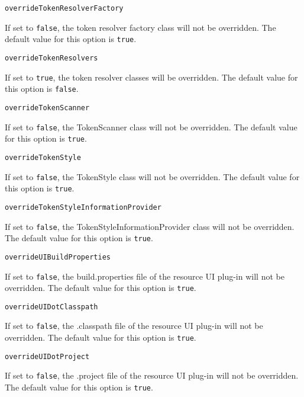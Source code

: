 \noindent\texttt{overrideTokenResolverFactory}
\begin{myindentpar}{1cm}
If set to \texttt{false}, the token resolver factory class will not be overridden. The default value for this option is \texttt{true}.
\end{myindentpar}

\noindent\texttt{overrideTokenResolvers}
\begin{myindentpar}{1cm}
If set to \texttt{true}, the token resolver classes will be overridden. The default value for this option is \texttt{false}.
\end{myindentpar}

\noindent\texttt{overrideTokenScanner}
\begin{myindentpar}{1cm}
If set to \texttt{false}, the TokenScanner class will not be overridden. The default value for this option is \texttt{true}.
\end{myindentpar}

\noindent\texttt{overrideTokenStyle}
\begin{myindentpar}{1cm}
If set to \texttt{false}, the TokenStyle class will not be overridden. The default value for this option is \texttt{true}.
\end{myindentpar}

\noindent\texttt{overrideTokenStyleInformationProvider}
\begin{myindentpar}{1cm}
If set to \texttt{false}, the TokenStyleInformationProvider class will not be overridden. The default value for this option is \texttt{true}.
\end{myindentpar}

\noindent\texttt{overrideUIBuildProperties}
\begin{myindentpar}{1cm}
If set to \texttt{false}, the build.properties file of the resource UI plug-in will not be overridden. The default value for this option is \texttt{true}.
\end{myindentpar}

\noindent\texttt{overrideUIDotClasspath}
\begin{myindentpar}{1cm}
If set to \texttt{false}, the .classpath file of the resource UI plug-in will not be overridden. The default value for this option is \texttt{true}.
\end{myindentpar}

\noindent\texttt{overrideUIDotProject}
\begin{myindentpar}{1cm}
If set to \texttt{false}, the .project file of the resource UI plug-in will not be overridden. The default value for this option is \texttt{true}.
\end{myindentpar}

